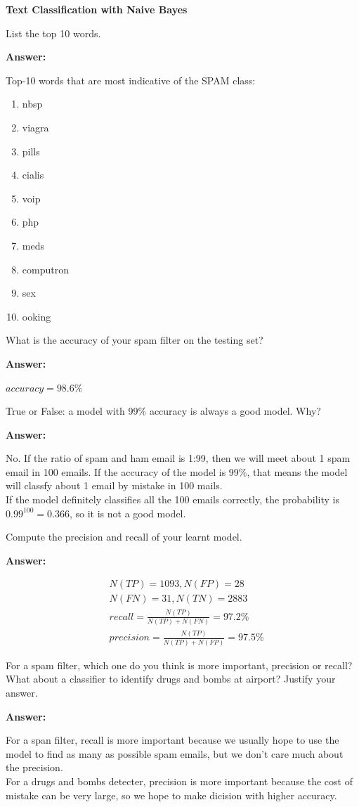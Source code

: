 \documentclass[12pt,twoside]{article}
\newcommand{\answer}{
 \par\medskip
 \textbf{Answer:}
}
\newcommand{\answerIIIIa}{ \answer
Top-10 words that are most indicative of the SPAM class:
\begin{enumerate}
	\item nbsp
	\item viagra
	\item pills
	\item cialis
	\item voip
	\item php
	\item meds
	\item computron
	\item sex
	\item ooking
\end{enumerate}

}
\newcommand{\answerIIIIb}{ \answer
$accuracy = 98.6\%$
}
\newcommand{\answerIIIIc}{ \answer
No. If the ratio of spam and ham email is 1:99, then we will meet about 1 spam email in 100 emails.
If the accuracy of the model is 99\%, that means the model will classfy about 1 email by mistake in 
100 mails.\\
If the model definitely classifies all the 100 emails correctly, the probability is $0.99^{100}=0.366$, 
so it is not a good model.
}
\newcommand{\answerIIIId}{ \answer
\begin{displaymath}
	\begin{aligned}
	&N(TP) = 1093, N(FP) = 28\\
	&N(FN) = 31, N(TN) = 2883\\
	&recall = \frac{N(TP)}{N(TP)+N(FN)} = 97.2\%\\
	&precision = \frac{N(TP)}{N(TP)+N(FP)} = 97.5\%
	\end{aligned}
\end{displaymath}
}
\newcommand{\answerIIIIe}{ \answer
For a span filter, recall is more important because we usually hope to use the model to find as many as possible spam emails, but we 
don't care much about the precision.\\
For a drugs and bombs detecter, precision is more important because the cost of mistake can be very large, so we hope to make dicision
with higher accuracy.
}
\begin{document}
\begin{problems}
\newpage

\problem  \textbf{Text Classification with Naive Bayes}

\begin{problemparts}
\problempart  List the top 10 words.

\answerIIIIa

\problempart What is the accuracy of your spam filter on the testing set?
\answerIIIIb

\problempart True or False: a model with 99\% accuracy is always a good model. Why?
\answerIIIIc

\problempart Compute the precision and recall of your learnt model.
\answerIIIId 

\problempart For a spam filter, which one do you think is more important, precision or recall? What about a classifier to identify drugs and bombs at airport? Justify your answer.
\answerIIIIe 

\end{problemparts}

\end{problems}
\end{document}
